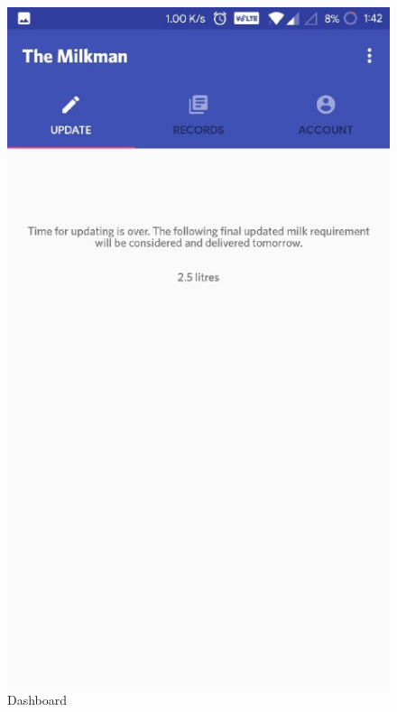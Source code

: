\begin{figure}[h]
  \begin{center}
\includegraphics[scale=0.6]{3/six.jpeg}
\caption{Dashboard}
\label{fig:two}
\end{center}
\end{figure}

